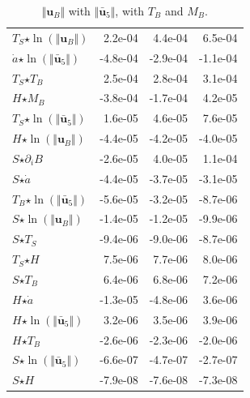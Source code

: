 \begin{table}[H]
\begin{tabular}{l|r|r|r}
  $T_S$$ \star $$\ln\left( \Vert \mathbf{u}_B \Vert \right)$ & 2.2e-04 & 4.4e-04 & 6.5e-04 \\
  $\dot{a}$$ \star $$\ln\left( \Vert \bar{\mathbf{u}}_{5} \Vert \right)$ & -4.8e-04 & -2.9e-04 & -1.1e-04 \\
  $T_S$$ \star $$T_B$ & 2.5e-04 & 2.8e-04 & 3.1e-04 \\
  \color{red}$H$$ \star $$M_B$ & \color{red}-3.8e-04 & \color{red}-1.7e-04 & \color{red}4.2e-05 \\
  $T_S$$ \star $$\ln\left( \Vert \bar{\mathbf{u}}_{5} \Vert \right)$ & 1.6e-05 & 4.6e-05 & 7.6e-05 \\
  $H$$ \star $$\ln\left( \Vert \mathbf{u}_B \Vert \right)$ & -4.4e-05 & -4.2e-05 & -4.0e-05 \\
  \color{red}$S$$ \star $$\partial_i B$ & \color{red}-2.6e-05 & \color{red}4.0e-05 & \color{red}1.1e-04 \\
  $S$$ \star $$\dot{a}$ & -4.4e-05 & -3.7e-05 & -3.1e-05 \\
  $T_B$$ \star $$\ln\left( \Vert \bar{\mathbf{u}}_{5} \Vert \right)$ & -5.6e-05 & -3.2e-05 & -8.7e-06 \\
  $S$$ \star $$\ln\left( \Vert \mathbf{u}_B \Vert \right)$ & -1.4e-05 & -1.2e-05 & -9.9e-06 \\
  $S$$ \star $$T_S$ & -9.4e-06 & -9.0e-06 & -8.7e-06 \\
  $T_S$$ \star $$H$ & 7.5e-06 & 7.7e-06 & 8.0e-06 \\
  $S$$ \star $$T_B$ & 6.4e-06 & 6.8e-06 & 7.2e-06 \\
  \color{red}$H$$ \star $$\dot{a}$ & \color{red}-1.3e-05 & \color{red}-4.8e-06 & \color{red}3.6e-06 \\
  $H$$ \star $$\ln\left( \Vert \bar{\mathbf{u}}_{5} \Vert \right)$ & 3.2e-06 & 3.5e-06 & 3.9e-06 \\
  $H$$ \star $$T_B$ & -2.6e-06 & -2.3e-06 & -2.0e-06 \\
  $S$$ \star $$\ln\left( \Vert \bar{\mathbf{u}}_{5} \Vert \right)$ & -6.6e-07 & -4.7e-07 & -2.7e-07 \\
  $S$$ \star $$H$ & -7.9e-08 & -7.6e-08 & -7.3e-08 \\
\end{tabular}
  \caption[]{$\Vert \mathbf{u}_B \Vert$ with $\Vert \mathbf{\bar{u}}_5 \Vert$, with $T_B$ and $M_B$.}
\end{table}

\newpage

